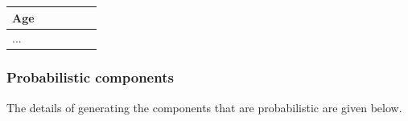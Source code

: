 \documentclass[]{article}
\begin{document}
\begin{table}[!h]
{\begin{tabular}{l|l|l|l|l|l}
Age            &                        &                                                                                                      &                                                                                   &                                                                  &                                                                                                                                                                   \\ \hline
...            &                        &                                                                                                      &                                                                                   &                                                                  &                                                                                                                                                                   \\ \hline
\end{tabular}%
}
\label{preprocess}
\end{table}
 
\subsubsection{Probabilistic components}
The details of generating the components that are probabilistic are given below. %
\end{document}
